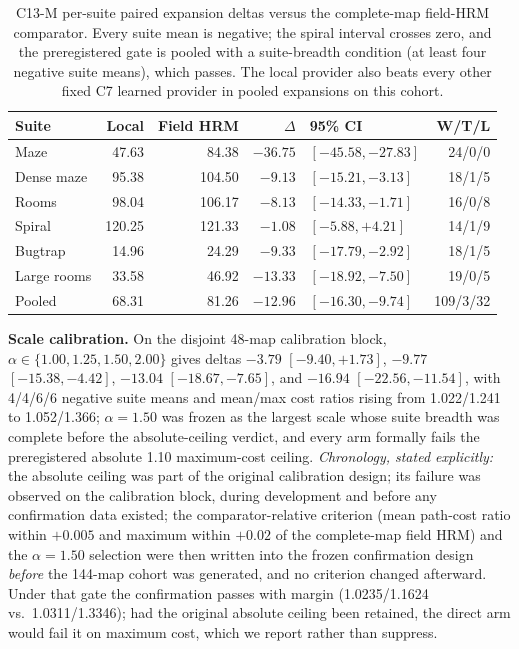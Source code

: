 \documentclass[letterpaper]{article} %
\newcommand{\stage}[1]{\textsc{#1}}
\begin{document}
\begin{table}[h]
\centering
\scriptsize
\setlength{\tabcolsep}{2.5pt}
\begin{tabular}{@{}lrrrlr@{}}
\toprule
Suite & Local & Field HRM & $\Delta$ & 95\% CI & W/T/L \\
\midrule
Maze & 47.63 & 84.38 & $-36.75$ & $[-45.58,-27.83]$ & 24/0/0 \\
Dense maze & 95.38 & 104.50 & $-9.13$ & $[-15.21,-3.13]$ & 18/1/5 \\
Rooms & 98.04 & 106.17 & $-8.13$ & $[-14.33,-1.71]$ & 16/0/8 \\
Spiral & 120.25 & 121.33 & $-1.08$ & $[-5.88,+4.21]$ & 14/1/9 \\
Bugtrap & 14.96 & 24.29 & $-9.33$ & $[-17.79,-2.92]$ & 18/1/5 \\
Large rooms & 33.58 & 46.92 & $-13.33$ & $[-18.92,-7.50]$ & 19/0/5 \\
\midrule
Pooled & 68.31 & 81.26 & $-12.96$ & $[-16.30,-9.74]$ & 109/3/32 \\
\bottomrule
\end{tabular}
\caption{\stage{C13-M} per-suite paired expansion deltas versus the complete-map field-HRM comparator. Every suite mean is negative; the spiral interval crosses zero, and the preregistered gate is pooled with a suite-breadth condition (at least four negative suite means), which passes. The local provider also beats every other fixed \stage{C7} learned provider in pooled expansions on this cohort.}
\label{tab:c13msuite}
\end{table}

\textbf{Scale calibration.} On the disjoint 48-map calibration block, $\alpha\in\{1.00,1.25,1.50,2.00\}$ gives deltas $-3.79$ $[-9.40,+1.73]$, $-9.77$ $[-15.38,-4.42]$, $-13.04$ $[-18.67,-7.65]$, and $-16.94$ $[-22.56,-11.54]$, with 4/4/6/6 negative suite means and mean/max cost ratios rising from 1.022/1.241 to 1.052/1.366; $\alpha{=}1.50$ was frozen as the largest scale whose suite breadth was complete before the absolute-ceiling verdict, and every arm formally fails the preregistered absolute 1.10 maximum-cost ceiling. \emph{Chronology, stated explicitly:} the absolute ceiling was part of the original calibration design; its failure was observed on the calibration block, during development and before any confirmation data existed; the comparator-relative criterion (mean path-cost ratio within $+0.005$ and maximum within $+0.02$ of the complete-map field HRM) and the $\alpha{=}1.50$ selection were then written into the frozen confirmation design \emph{before} the 144-map cohort was generated, and no criterion changed afterward. Under that gate the confirmation passes with margin (1.0235/1.1624 vs.\ 1.0311/1.3346); had the original absolute ceiling been retained, the direct arm would fail it on maximum cost, which we report rather than suppress.
\end{document}
